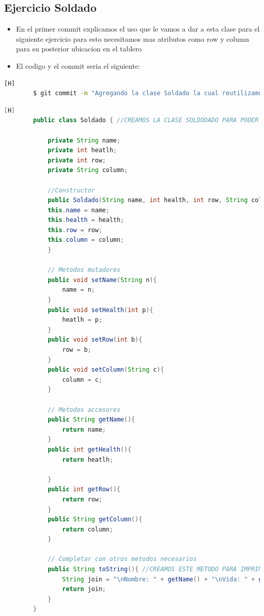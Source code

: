 \documentclass{article}
\begin{document}
	\subsection{Ejercicio Soldado}
	\begin{itemize}	
		\item En el primer commit explicamos el uso que le vamos a dar a esta clase para el siguiente ejercicio para esto necesitamos mas atributos como row y column para su posterior ubicacion en el tablero
		\item El codigo y el commit seria el siguiente:
	\end{itemize}	
	\begin{lstlisting}[language=bash,caption={Commit}][H]
		$ git commit -m "Agregando la clase Soldado la cual reutilizamos donde agregamos un metodo constructor y tambien anadimos los atributos row y column con sus respectivos getters y setters"
	\end{lstlisting}	
	\begin{lstlisting}[language=java,caption={Las lineas de codigos del metodo creado:}][H]
		public class Soldado { //CREAMOS LA CLASE SOLDODADO PARA PODER USAR UN ARREGLO BIDIMENSIONAL DONDE NECESITAMOS LA VIDA , EL NOMBRE DEL SOLDADO Y TAMBIEN SU POSICION COMO LA FILA Y LA COLUMNA   

			private String name;
			private int heatlh; 
			private int row;
			private String column;

			//Constructor
			public Soldado(String name, int health, int row, String column){
			this.name = name;
			this.health = health;
			this.row = row;
			this.column = column;
			}

			// Metodos mutadores
			public void setName(String n){
				name = n;
			}
			public void setHealth(int p){
				heatlh = p;
			}
			public void setRow(int b){
				row = b;
			}
			public void setColumn(String c){
				column = c; 
			}

			// Metodos accesores
			public String getName(){
				return name;
			}
			public int getHealth(){
				return heatlh;

			}
			public int getRow(){
				return row;
			}
			public String getColumn(){
				return column;
			}

			// Completar con otros metodos necesarios
			public String toString(){ //CREAMOS ESTE METODO PARA IMPRIMIR LOS DATOS DEl OBJETO
				String join = "\nNombre: " + getName() + "\nVida: " + getHealth() + "\nFila: " + getRow() + "\nColumna: " + getColumn(); //Agregamos un espaciador para poder separar
				return join;
			}
		}
	\end{lstlisting}
\end{document}
